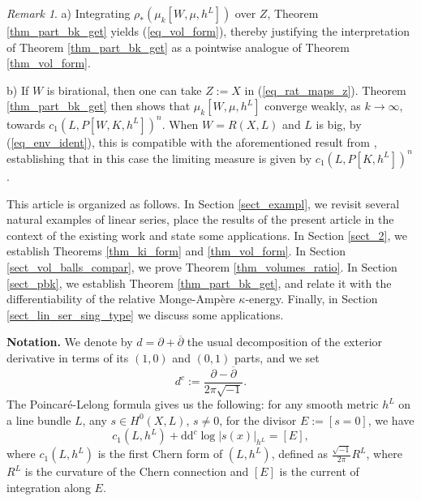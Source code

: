 \documentclass[12pt]{article}
\numberwithin{equation}{section}
\theoremstyle{theorem}
\theoremstyle{definition}
\theoremstyle{remark}
\newtheorem{rem}[thm]{Remark}
\newcommand{\imun} {\sqrt{-1}}
\newcommand{\dbar}{ \overline{\partial} }
\newcommand{\ddc}{\mathrm{d} \mathrm{d}^c}
\begin{document}
	\begin{rem}
		a)
		Integrating $\rho_{*}(\mu_k[W, \mu, h^L])$ over $Z$, Theorem \ref{thm_part_bk_get} yields (\ref{eq_vol_form}), thereby justifying the interpretation of Theorem \ref{thm_part_bk_get} as a pointwise analogue of Theorem \ref{thm_vol_form}.
		\par 
		b) 
		If $W$ is birational, then one can take $Z := X$ in (\ref{eq_rat_maps_z}).
		Theorem \ref{thm_part_bk_get} then shows that $\mu_k[W, \mu, h^L]$ converge weakly, as $k \to \infty$, towards $c_1(L, P[W, K, h^L])^{n}$. 
		When $W = R(X, L)$ and $L$ is big, by (\ref{eq_env_ident}), this is compatible with the aforementioned result from \cite{BerBoucNys}, establishing that in this case the limiting measure is given by $c_1(L, P[K, h^L])^n$.
	\end{rem}
	\par 
	This article is organized as follows.
	In Section \ref{sect_exampl}, we revisit several natural examples of linear series, place the results of the present article in the context of the existing work and state some applications.
	In Section \ref{sect_2}, we establish Theorems \ref{thm_ki_form} and \ref{thm_vol_form}.
	In Section \ref{sect_vol_balls_compar}, we prove Theorem \ref{thm_volumes_ratio}.
	In Section \ref{sect_pbk}, we establish Theorem \ref{thm_part_bk_get}, and relate it with the differentiability of the relative Monge-Ampère $\kappa$-energy.
	Finally, in Section \ref{sect_lin_ser_sing_type} we discuss some applications.
	\par
	\textbf{Notation.}
	We denote by $d = \partial + \dbar$ the usual decomposition of the exterior derivative in terms of its $(1, 0)$ and $(0, 1)$ parts, and we set 
	\begin{equation}
		d^c := \frac{\partial - \dbar}{2 \pi \imun}.	
	\end{equation}
	The Poincaré-Lelong formula gives us the following: for any smooth metric $h^L$ on a line bundle $L$, any $s \in H^0(X, L)$, $s \neq 0$, for the divisor $E := [s = 0]$, we have
	\begin{equation}\label{eq_poinc_lll}
		c_1(L, h^L) + \ddc \log |s(x)|_{h^L} = [E],
	\end{equation}
	where $c_1(L, h^L)$ is the first Chern form of $(L, h^L)$, defined as $\frac{\imun}{2 \pi} R^L$, where $R^L$ is the curvature of the Chern connection and $[E]$ is the current of integration along $E$.
\end{document}
